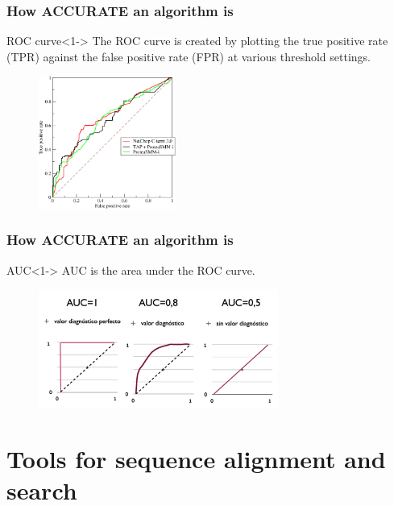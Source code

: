 \documentclass[UTF8]{beamer}
\begin{document}
	\begin{frame}
	    \frametitle{How ACCURATE an algorithm is}
		\begin{block}{ROC curve}<1->
			The ROC curve is created by plotting the true positive rate (\alert{TPR}) against the false positive rate (\alert{FPR}) at various threshold settings.
		\end{block}
		\begin{figure}[H]
			\centering
			\includegraphics[width=0.4\textwidth]{image/Roccurves}
			\label{ROC-2}
		\end{figure}
    \end{frame}

	\begin{frame}
	    \frametitle{How ACCURATE an algorithm is}
		\begin{block}{AUC}<1->
			AUC is the area under the ROC curve.
		\end{block}
		\begin{example}
			\begin{figure}[H]
				\centering
				\includegraphics[width=0.7\textwidth]{image/Curvas}
				\label{ROC-3}
			\end{figure}
		\end{example}
    \end{frame}

    \section{Tools for sequence alignment and search}
\end{document}

